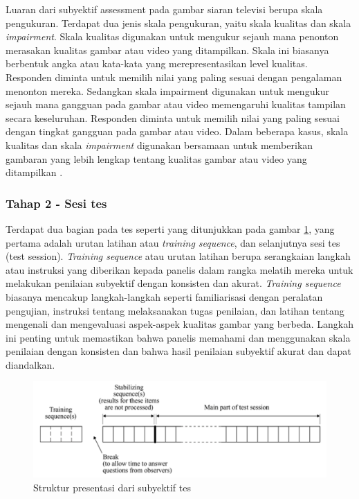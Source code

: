 Luaran dari subyektif assessment pada gambar siaran televisi berupa skala pengukuran. Terdapat dua jenis skala pengukuran, yaitu skala kualitas dan skala \textit{impairment}. Skala kualitas digunakan untuk mengukur sejauh mana penonton merasakan kualitas gambar atau video yang ditampilkan. Skala ini biasanya berbentuk angka atau kata-kata yang merepresentasikan level kualitas. Responden diminta untuk memilih nilai yang paling sesuai dengan pengalaman menonton mereka. Sedangkan skala impairment digunakan untuk mengukur sejauh mana gangguan pada gambar atau video memengaruhi kualitas tampilan secara keseluruhan. Responden diminta untuk memilih nilai yang paling sesuai dengan tingkat gangguan pada gambar atau video. Dalam beberapa kasus, skala kualitas dan skala \textit{impairment} digunakan bersamaan untuk memberikan gambaran yang lebih lengkap tentang kualitas gambar atau video yang ditampilkan \citep{Mittal_2012}.

\subsubsection{Tahap 2 - Sesi tes}
\hspace{1,2cm}
Terdapat dua bagian pada tes seperti yang ditunjukkan pada gambar \ref{structure-tes}, yang pertama adalah urutan latihan atau \textit{training sequence}, dan selanjutnya sesi tes (test session). \textit{Training sequence} atau urutan latihan berupa serangkaian langkah atau instruksi yang diberikan kepada panelis dalam rangka melatih mereka untuk melakukan penilaian subyektif dengan konsisten dan akurat. \textit{Training sequence} biasanya mencakup langkah-langkah seperti familiarisasi dengan peralatan pengujian, instruksi tentang melaksanakan tugas penilaian, dan latihan tentang mengenali dan mengevaluasi aspek-aspek kualitas gambar yang berbeda. Langkah ini penting untuk memastikan bahwa panelis memahami dan menggunakan skala penilaian dengan konsisten dan bahwa hasil penilaian subyektif akurat dan dapat diandalkan. 

\begin{figure}[H]
	\vspace{-0.1cm}
	\begin{center}
		\includegraphics[width=1\columnwidth]{bab3/Gambar/structure-tes.png}
	\end{center}
	\vspace{-0.2cm}
	\caption{Struktur presentasi dari subyektif tes} \label{structure-tes}
\end{figure}

